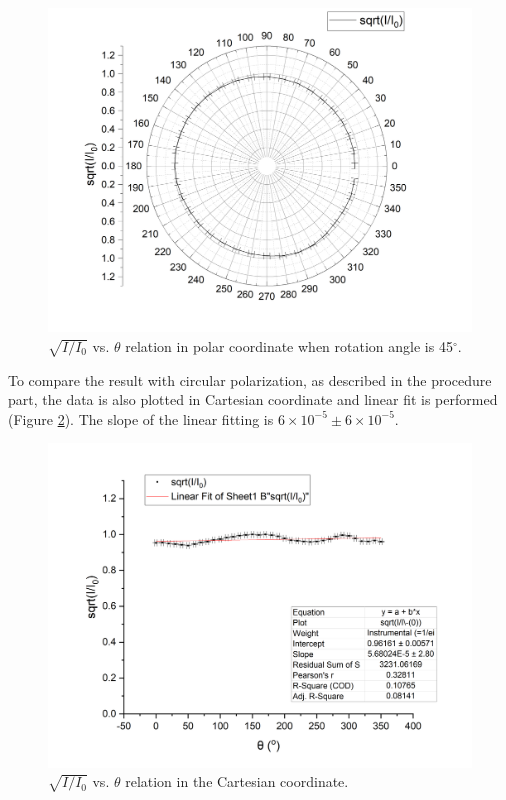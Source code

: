 \documentclass{article}
\begin{document}
\begin{figure}[H]\centering
\includegraphics[scale=0.45]{5.png}
\caption{$\sqrt{I/I_0}$ vs. $\theta$ relation in polar coordinate when rotation angle is 45$^\circ$.}\label{Fig45}
\end{figure}

To compare the result with circular polarization, as described in the procedure part, the data is also plotted in Cartesian coordinate and linear fit is performed (Figure \ref{Fig45l}). The slope of the linear fitting is $6 \times 10^{-5} \pm 6 \times 10^{-5}$.

\begin{figure}[H]\centering
\includegraphics[scale=0.45]{6.png}
\caption{$\sqrt{I/I_0}$ vs. $\theta$ relation in the Cartesian coordinate.}\label{Fig45l}
\end{figure}
\end{document}
